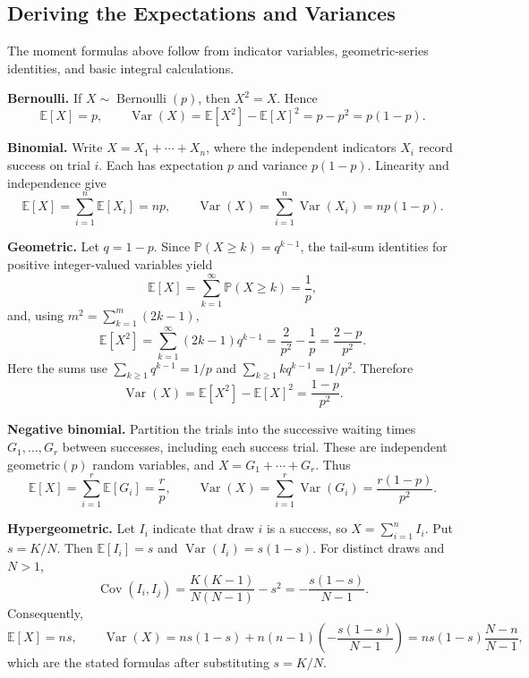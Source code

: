 \documentclass[a4paper,11pt,abstracton]{scrartcl}
\theoremstyle{dotlessP}
\theoremstyle{dotlessS}
\theoremstyle{remark}
\theoremstyle{definition}
\begin{document}
\subsection{Deriving the Expectations and Variances}

The moment formulas above follow from indicator variables, geometric-series identities, and basic integral calculations.

\begin{claim_box}
\textbf{Bernoulli.} If $X\sim\operatorname{Bernoulli}(p)$, then $X^2=X$. Hence
\[
  \mathbb{E}[X]=p,\qquad
  \operatorname{Var}(X)=\mathbb{E}[X^2]-\mathbb{E}[X]^2=p-p^2=p(1-p).
\]
\end{claim_box}

\begin{claim_box}
\textbf{Binomial.} Write $X=X_1+\cdots+X_n$, where the independent indicators $X_i$ record success on trial $i$. Each has expectation $p$ and variance $p(1-p)$. Linearity and independence give
\[
  \mathbb{E}[X]=\sum_{i=1}^n\mathbb{E}[X_i]=np,
  \qquad
  \operatorname{Var}(X)=\sum_{i=1}^n\operatorname{Var}(X_i)=np(1-p).
\]
\end{claim_box}

\begin{claim_box}
\textbf{Geometric.} Let $q=1-p$. Since $\mathbb{P}(X\geq k)=q^{k-1}$, the tail-sum identities for positive integer-valued variables yield
\[
  \mathbb{E}[X]=\sum_{k=1}^{\infty}\mathbb{P}(X\geq k)=\frac{1}{p},
\]
and, using $m^2=\sum_{k=1}^{m}(2k-1)$,
\[
  \mathbb{E}[X^2]=\sum_{k=1}^{\infty}(2k-1)q^{k-1}
  =\frac{2}{p^2}-\frac{1}{p}=\frac{2-p}{p^2}.
\]
Here the sums use $\sum_{k\geq1}q^{k-1}=1/p$ and $\sum_{k\geq1}kq^{k-1}=1/p^2$. Therefore
\[
  \operatorname{Var}(X)=\mathbb{E}[X^2]-\mathbb{E}[X]^2
  =\frac{1-p}{p^2}.
\]
\end{claim_box}

\begin{claim_box}
\textbf{Negative binomial.} Partition the trials into the successive waiting times $G_1,\ldots,G_r$ between successes, including each success trial. These are independent geometric$(p)$ random variables, and $X=G_1+\cdots+G_r$. Thus
\[
  \mathbb{E}[X]=\sum_{i=1}^r\mathbb{E}[G_i]=\frac{r}{p},
  \qquad
  \operatorname{Var}(X)=\sum_{i=1}^r\operatorname{Var}(G_i)
  =\frac{r(1-p)}{p^2}.
\]
\end{claim_box}

\begin{claim_box}
\textbf{Hypergeometric.} Let $I_i$ indicate that draw $i$ is a success, so $X=\sum_{i=1}^n I_i$. Put $s=K/N$. Then $\mathbb{E}[I_i]=s$ and $\operatorname{Var}(I_i)=s(1-s)$. For distinct draws and $N>1$,
\[
  \operatorname{Cov}(I_i,I_j)
  =\frac{K(K-1)}{N(N-1)}-s^2
  =-\frac{s(1-s)}{N-1}.
\]
Consequently,
\[
  \mathbb{E}[X]=ns,\qquad
  \operatorname{Var}(X)=ns(1-s)+n(n-1)\left(-\frac{s(1-s)}{N-1}\right)
  =ns(1-s)\frac{N-n}{N-1},
\]
which are the stated formulas after substituting $s=K/N$.
\end{claim_box}
\end{document}
